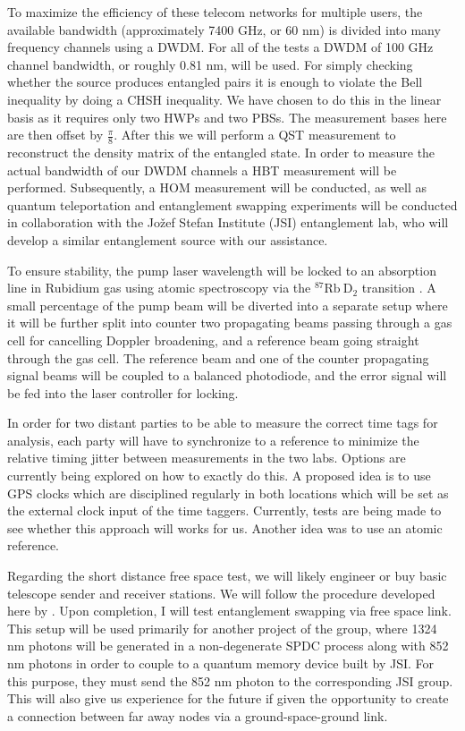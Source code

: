 \documentclass{article}
\theoremstyle{mytheoremstyle}
\theoremstyle{mytheoremstyle}
\theoremstyle{myproblemstyle}
\begin{document}
\par To maximize the efficiency of these telecom networks for multiple users, the available bandwidth (approximately 7400 GHz, or 60 nm)
is divided into many frequency channels using a DWDM.
For all of the tests a DWDM of 100 GHz channel bandwidth, or roughly 0.81 nm, will be used.
For simply checking whether the source produces entangled pairs it is enough
to violate the Bell inequality by doing a CHSH \cite{Clauser_Horne_Shimony_Holt_1969} inequality.
We have chosen to do this in the linear basis as it requires
only two HWPs and two PBSs. The measurement bases here are then offset by $\frac{\pi}{8}$. After this
we will perform a QST measurement to reconstruct \cite{James_Kwiat_Munro_White_2001} the density matrix of the entangled state.
In order to measure the actual bandwidth of our DWDM channels a HBT measurement will be performed.
Subsequently, a HOM measurement will be conducted, as well as quantum teleportation \cite{Bouwmeester_Pan_Mattle_Eibl_Weinfurter_Zeilinger_1997}
and entanglement swapping \cite{Jennewein_Weihs_Pan_Zeilinger_2001} experiments will be conducted in collaboration with the Jožef Stefan Institute (JSI)
entanglement lab, who will develop a similar entanglement source with our assistance.

To ensure stability, the pump laser wavelength will be locked to an absorption line in Rubidium gas using atomic spectroscopy
via the $\mathrm{^{87}Rb\ D_2}$ transition \cite{metger2017sas}. A small percentage of the pump beam will be diverted into a separate
setup where it will be further split into counter two propagating beams passing through a gas cell for cancelling Doppler broadening,
and a reference beam going straight through the gas cell. The reference beam and one of the counter propagating signal beams will be
coupled to a balanced photodiode, and the error signal will be fed into the laser controller for locking.

In order for two distant parties to be able to measure the correct time tags for analysis, each party will have to synchronize
to a reference to minimize the relative timing jitter between measurements in the two labs. Options are currently being explored on how to exactly do this.
A proposed idea is to use GPS clocks which are disciplined regularly in both locations which will be set as the external clock input of the time taggers.
Currently, tests are being made to see whether this approach will works for us. Another idea was to use an atomic reference.

Regarding the short distance free space test, we will likely engineer or buy basic telescope sender and receiver stations.
We will follow the procedure developed here by \cite{Kržič_2024}. Upon completion, I will test entanglement swapping via free space
link. This setup will be used primarily for another project of the group, where 1324 nm photons will be generated in a non-degenerate SPDC process
along with 852 nm photons in order to couple to a quantum memory device built by JSI. For this purpose, they must send the 852 nm photon
to the corresponding JSI group. This will also give us experience for the future if given the opportunity to create a connection between
far away nodes via a ground-space-ground link.
\end{document}
